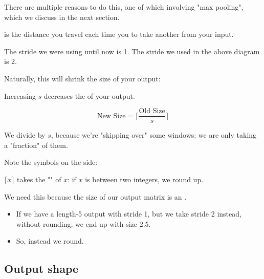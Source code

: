         There are multiple reasons to do this, one of which involving "max pooling", which we discuss in the next section.\\

        \begin{definition}
             is the distance you travel each time you  to take another  from your input.
        \end{definition}

        \miniex The stride we were using until now is 1. The stride we used in the above diagram is 2.

        Naturally, this will shrink the size of your output:\\

        \begin{concept}
            Increasing  $s$ decreases the  of your output.

            \begin{equation*}
                \text{New Size} = 
                \Bigg\lceil \frac{\text{Old Size}}{s} \Bigg\rceil
            \end{equation*}

            We divide by $s$, because we're "skipping over" some windows: we are only taking a "fraction" of them.
        \end{concept}

        Note the symbols on the side:\\

        \begin{notation}
            $\lceil x \rceil$ takes the "" of $x$: if $x$ is between two integers, we round up.
        \end{notation}

        We need this because the size of our output matrix is an .

        \begin{itemize}
            \item If we have a length-5 output with stride 1, but we take stride 2 instead, without rounding, we end up with size 2.5.
            \item So, instead we round.
        \end{itemize}

    \subsection{Output shape}

